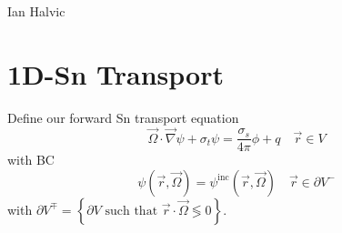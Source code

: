 \documentclass{article}
\newcommand{\vr}{\vec{r}}
\newcommand{\vO}{\vec{\Omega}}
\newcommand{\vgrad}{\vec{\nabla}}
\begin{document}
\begin{center}
Ian Halvic \\
\end{center}

\section{1D-Sn Transport}

Define our forward Sn transport equation
\[
\vO \cdot \vgrad \psi + \sigma_t \psi = \frac{\sigma_s}{4 \pi} \phi + q \quad \vr \in V
\]
with BC 
\[
\psi(\vr,\vO) = \psi^{\text{inc}}(\vr,\vO) \quad \vr \in \partial V^-
\]
with $\partial V^{\mp}=\left\{ \partial V \text{ such that } \vr \cdot \vO \lessgtr 0 \right\}$.
\end{document}

